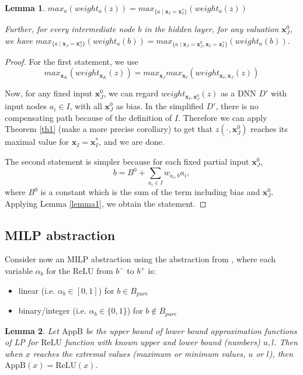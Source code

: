 \documentclass[]{article}
\newtheorem{lemma}{Lemma}
\theoremstyle{definition}
\newcommand{\ReLU}{\mathrm{ReLU}}
\begin{document}
\begin{lemma} \label{lem:reach_max}
	$max_a (weight_{a}(z)) = max_{\{a \mid \boldsymbol{x}_I=\boldsymbol{x}^*_I\}} (weight_{a}(z))$
	
	Further, for every intermediate node $b$ in the hidden layer, for any valuation $\boldsymbol{x}^0_J$, 
	we have $max_{\{a \mid \boldsymbol{x}_J=\boldsymbol{x}^0_J\}} (weight_{a}(b)) = max_{\{a \mid \boldsymbol{x}_J=\boldsymbol{x}^0_J,\boldsymbol{x}_I=\boldsymbol{x}_I^*\}} (weight_{a}(b))$.	
\end{lemma}

\begin{proof}
	For the first statement, we use 
	$$max_{\boldsymbol{x}_K} (weight_{\boldsymbol{x}_K}(z)) = max_{\boldsymbol{x}_J} max_{\boldsymbol{x}_I} (weight_{\boldsymbol{x}_I,\boldsymbol{x}_J}(z))$$
	
	Now, for any fixed input $\boldsymbol{x}^0_J$, we can regard $weight_{\boldsymbol{x}_I,\boldsymbol{x}^0_J}(z)$ as a DNN $D'$ with input nodes $a_i\in I$, with all $\boldsymbol{x}^0_J$ %
	as bias. In the simplified $D'$, there is no compensating path because of the definition of $I$. Therefore we can apply Theorem \ref{th1} (make a more precise corollary) to get that $z(\cdot,\boldsymbol{x}^0_J)$ reaches its maximal value for $\boldsymbol{x}_I=\boldsymbol{x}_I^*$, and we are done.
	
	The second statement is simpler because for each fixed partial input $\boldsymbol{x}^0_J$, 
	$$b= B^0 +\sum_{a_i\in I} w_{a_i, b} a_i,$$ where $B^0$ is a constant which is the sum of the term including bias and $\boldsymbol{x}^0_J$. Applying Lemma \ref{lemma1}, we obtain the statement.
\end{proof}

\subsection{MILP abstraction}

Consider now an MILP abstraction using the abstraction from \cite{MILP}, 
where each variable $\alpha_b$ for the ReLU from $b^-$ to $b^+$ is:
\begin{itemize}
	\item linear  (i.e. $\alpha_b \in [0,1]$) for $b \in B_{pure}$
	\item binary/integer (i.e. $\alpha_b \in \{0,1\}$) for $b \notin B_{pure}$
\end{itemize}


\begin{lemma}\label{lem:AppB=ReLU}
	Let $\mathrm{AppB}$ be the upper bound of lower bound approximation functions of LP for $\ReLU$ function with known upper and lower bound (numbers) $u,l$. Then when $x$ reaches the extremal values (maximum or minimum values, $u$ or $l$), then $\mathrm{AppB}(x)=\ReLU(x)$.
	
\end{lemma}
\end{document}
